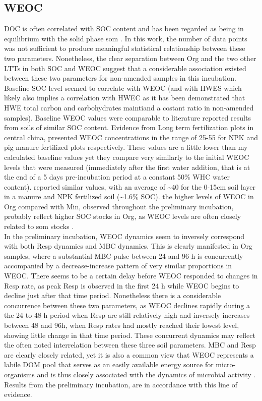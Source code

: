 	\subsection{WEOC}
	DOC is often correlated with SOC content and has been regarded as being in equilibrium with the solid phase \gls{som} \citep{malik2013}. In this work, the number of data points was not sufficient to produce meaningful statistical relationship between these two parameters. Nonetheless, the clear separation between Org and the two other LTTs in both SOC and WEOC suggest that a considerable association existed between these two parameters for non-amended samples in this incubation. Baseline SOC level seemed to correlate with WEOC (and with HWES which likely also implies a correlation with HWEC as it has been demonstrated that HWE total carbon and carbohydrates maintiand a costant ratio in non-amended samples).
	Baseline WEOC values were comparable to literature reported results from soils of similar SOC content. Evidence from Long term fertilization plots in central china, presented WEOC concentrations in the range of 25-55 \genericunit for NPK and pig manure fertilized plots respectively\citep{xu2018}. These values are a little lower than my calculated baseline values yet they compare very similarly to the initial WEOC levels that were measured (immediately after the first water addition, that is  at the end of a 5 days pre-incubation period at a constant 50\% WHC water content). \citet{hamkalo2014} reported similar values, with an average of \~{}40 \genericunit for the 0-15cm  soil layer in a manure and NPK fertilized soil (\~{}1.6\% SOC).
	the higher levels of WEOC in Org compared with Min, observed throughout the preliminary incubation, probably reflect higher SOC stocks in Org, as WEOC levels are often closely related to \gls{som} stocks\citep{malik2013} .\\
	In the preliminary incubation, WEOC dynamics seem to inversely correspond with both Resp dynamics and MBC dynamics. This is clearly manifested in Org samples, where a substantial MBC pulse between 24 and 96 h is concurrently accompanied by a decrease-increase pattern of very similar proportions in WEOC. There seems to be a certain delay before WEOC responded to changes in Resp rate, as peak Resp is observed in the first 24 h while WEOC begins to decline just after that time period. Nonetheless there is a considerable concurrence between these two parameters, as WEOC declines rapidly during a the 24 to 48 h period when Resp are still relatively high and inversely increases between 48 and 96h, when Resp rates had mostly reached their lowest level, showing little change in that time period. These concurrent dynamics may reflect the often noted interrelation between these three soil parameters. MBC and Resp are clearly closely related, yet it is also a common view that WEOC represents a labile DOM pool that serves as an easily available energy source for micro-organisms and is thus closely associated with the dynamics of microbial activity \citep{kemmitt2008, kaiser2012, guggenberger1998}. Results from the preliminary incubation, are in accordance with this line of evidence.\\


